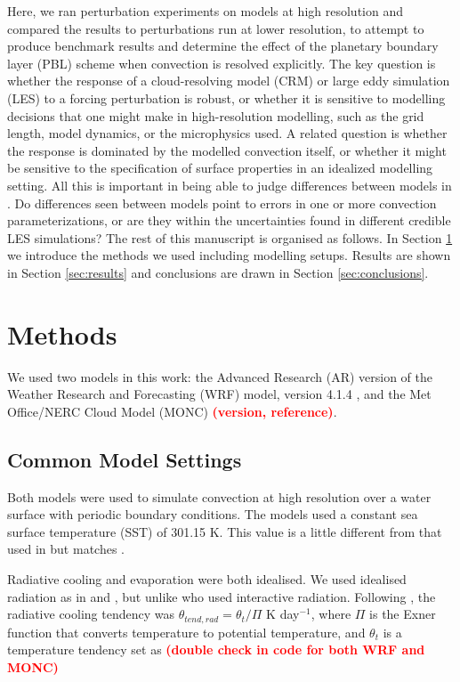 \documentclass[draft]{agujournal2019}
\newcommand{\todo}[1]{\textcolor{red}{\textbf{(#1)}}}
\begin{document}
Here, we ran perturbation experiments on models at high resolution and compared
the results to perturbations run at lower resolution, to attempt to produce
benchmark results and determine the effect of the planetary boundary layer (PBL)
scheme when convection is resolved explicitly. The key question is whether the
response of a cloud-resolving model (CRM) or large eddy simulation (LES) to a
forcing perturbation is robust, or whether it is sensitive to modelling
decisions that one might make in high-resolution modelling, such as the grid
length, model dynamics, or the microphysics used. A related question is whether
the response is dominated by the modelled convection itself, or whether it might
be sensitive to the specification of surface properties in an idealized
modelling setting. All this is important in being able to judge differences
between models in . Do differences seen between models
point to errors in one or more convection parameterizations, or are they within
the uncertainties found in different credible LES simulations? The rest of this
manuscript is organised as follows. In Section \ref{sec:methods} we introduce
the methods we used including modelling setups. Results are shown in Section
\ref{sec:results} and conclusions are drawn in Section \ref{sec:conclusions}.

\section{Methods}
\label{sec:methods}

We used two models in this work: the Advanced Research (AR) version of the
Weather Research and Forecasting (WRF) model, version 4.1.4
\cite{Skamarock_2019}, and the Met Office/NERC Cloud Model (MONC) \todo{version,
reference}. 

\subsection{Common Model Settings}

Both models were used to simulate convection at high resolution over
a water surface with periodic boundary conditions. The models used a constant
sea surface temperature (SST) of 301.15 K. This value is a little different from
that used in  but matches .

Radiative cooling and evaporation were both idealised. We used idealised
radiation as in  and , but
unlike  who used interactive radiation. Following
, the radiative cooling tendency was $\theta_{tend,rad}
= \theta_t/\Pi$ K day$^{-1}$, where $\Pi$ is the Exner function that converts
temperature to potential temperature, and $\theta_t$ is a temperature tendency
set as \todo{double check in code for both WRF and MONC}
\end{document}

